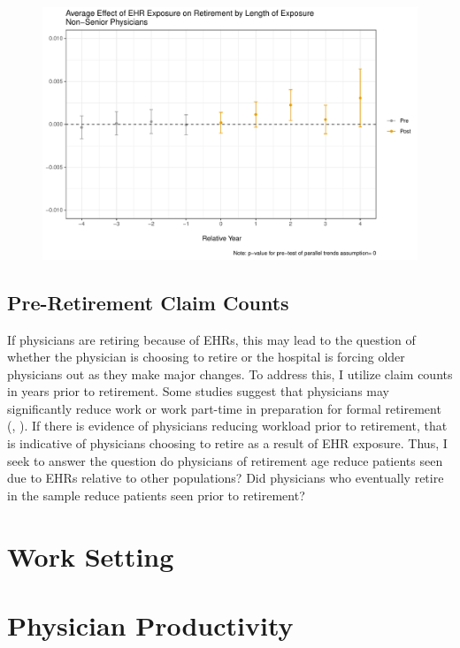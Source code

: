 \documentclass[11pt]{article}
\begin{document}
\begin{figure}[ht]
{\begin{minipage}[b]{0.47\linewidth}
            \includegraphics[width=\textwidth]{Objects/CS_retireyoung_allEHR.pdf}
        \end{minipage}}
        \label{fig:retirefirst}
\end{figure}



\subsection{Pre-Retirement Claim Counts}

If physicians are retiring because of EHRs, this may lead to the question of whether the physician is choosing to retire or the hospital is forcing older physicians out as they make major changes. To address this, I utilize claim counts in years prior to retirement. Some studies suggest that physicians may significantly reduce work or work part-time in preparation for formal retirement (\cite{hedden2017patterns}, \cite{acp_2017}). If there is evidence of physicians reducing workload prior to retirement, that is indicative of physicians choosing to retire as a result of EHR exposure. Thus, I seek to answer the question do physicians of retirement age reduce patients seen due to EHRs relative to other populations? Did physicians who eventually retire in the sample reduce patients seen prior to retirement? 




\section{Work Setting}

\newpage

\section{Physician Productivity}
\end{document}
